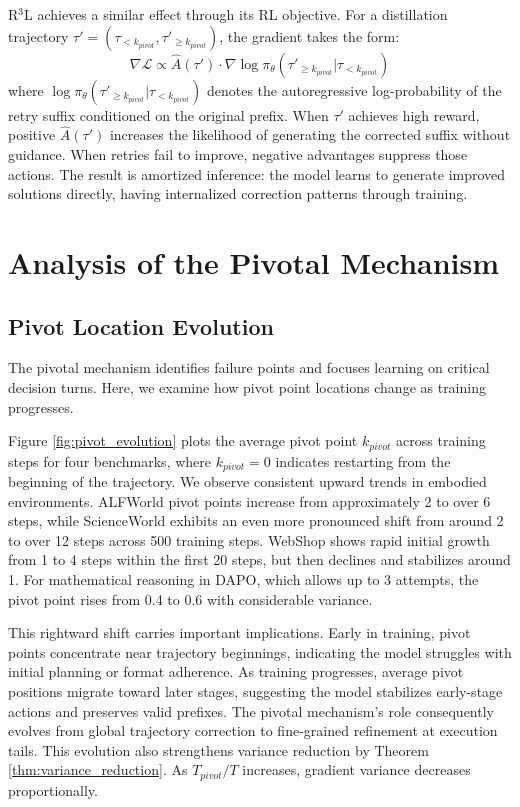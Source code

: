 \documentclass{article} %
\theoremstyle{definition}
\theoremstyle{remark}
\begin{document}
R$^3$L achieves a similar effect through its RL objective. For a distillation trajectory $\tau' = (\tau_{<k_{pivot}}, \tau'_{\geq k_{pivot}})$, the gradient takes the form:
\begin{equation}
\nabla \mathcal{L} \propto \hat{A}(\tau') \cdot \nabla \log \pi_{\theta}(\tau'_{\geq k_{pivot}} | \tau_{<k_{pivot}})
\end{equation}
where $\log \pi_{\theta}(\tau'_{\geq k_{pivot}} | \tau_{<k_{pivot}})$ denotes the autoregressive log-probability of the retry suffix conditioned on the original prefix. When $\tau'$ achieves high reward, positive $\hat{A}(\tau')$ increases the likelihood of generating the corrected suffix without guidance. When retries fail to improve, negative advantages suppress those actions. The result is amortized inference: the model learns to generate improved solutions directly, having internalized correction patterns through training.

\section{Analysis of the Pivotal Mechanism}
\label{sec:pivot_analysis}

\subsection{Pivot Location Evolution}

The pivotal mechanism identifies failure points and focuses learning on critical decision turns. Here, we examine how pivot point locations change as training progresses.



Figure \ref{fig:pivot_evolution} plots the average pivot point $k_{pivot}$ across training steps for four benchmarks, where $k_{pivot} = 0$ indicates restarting from the beginning of the trajectory. We observe consistent upward trends in embodied environments. ALFWorld pivot points increase from approximately 2 to over 6 steps, while ScienceWorld exhibits an even more pronounced shift from around 2 to over 12 steps across 500 training steps. WebShop shows rapid initial growth from 1 to 4 steps within the first 20 steps, but then declines and stabilizes around 1. For mathematical reasoning in DAPO, which allows up to 3 attempts, the pivot point rises from 0.4 to 0.6 with considerable variance.

This rightward shift carries important implications. Early in training, pivot points concentrate near trajectory beginnings, indicating the model struggles with initial planning or format adherence. As training progresses, average pivot positions migrate toward later stages, suggesting the model stabilizes early-stage actions and preserves valid prefixes. The pivotal mechanism's role consequently evolves from global trajectory correction to fine-grained refinement at execution tails. This evolution also strengthens variance reduction by Theorem \ref{thm:variance_reduction}. As $T_{pivot}/T$ increases, gradient variance decreases proportionally.
\end{document}
